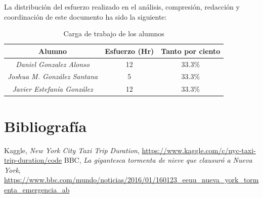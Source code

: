 \documentclass[12pt]{article}
\begin{document}
La distribución del esfuerzo realizado en el análisis, compresión, redacción y coordinación de este documento ha sido la siguiente:

\begin{table}[H]
\centering
\begin{tabular}{|c|c|c|}
\hline
Alumno         & Esfuerzo (Hr)    & Tanto por ciento  \\ \hline
\textit{Daniel Gonzalez Alonso}  &   12    & $33.3\%$      \\ \hline
\textit{Joshua M. González Santana}  & 5   & $33.3\%$      \\ \hline
\textit{Javier Estefanía González}  & 12  & $33.3\%$      \\ \hline
\end{tabular}
\caption{Carga de trabajo de los alumnos}
\end{table}

\section{Bibliografía}
\begin{thebibliography}{0}
      Kaggle,
      \emph{New York City Taxi Trip Duration},
      \url{https://www.kaggle.com/c/nyc-taxi-trip-duration/code}
      BBC,
      \emph{La gigantesca tormenta de nieve que clausuró a Nueva York},
      \url{https://www.bbc.com/mundo/noticias/2016/01/160123_eeuu_nueva_york_tormenta_emergencia_ab}
\end{thebibliography}
\end{document}

